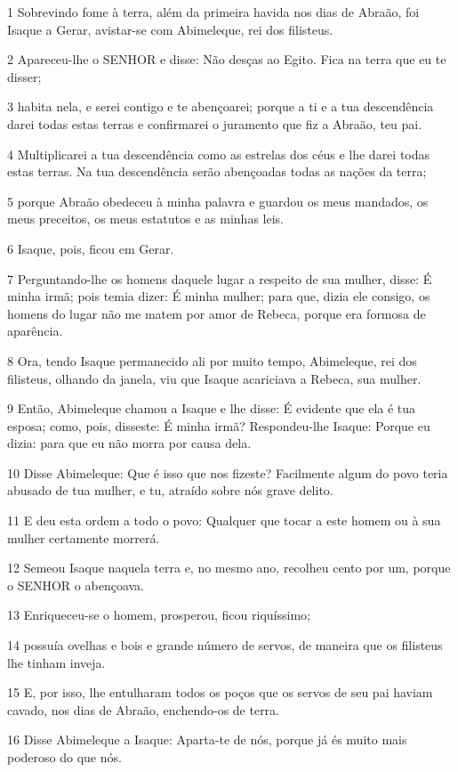 \par 1 Sobrevindo fome à terra, além da primeira havida nos dias de Abraão, foi Isaque a Gerar, avistar-se com Abimeleque, rei dos filisteus.
\par 2 Apareceu-lhe o SENHOR e disse: Não desças ao Egito. Fica na terra que eu te disser;
\par 3 habita nela, e serei contigo e te abençoarei; porque a ti e a tua descendência darei todas estas terras e confirmarei o juramento que fiz a Abraão, teu pai.
\par 4 Multiplicarei a tua descendência como as estrelas dos céus e lhe darei todas estas terras. Na tua descendência serão abençoadas todas as nações da terra;
\par 5 porque Abraão obedeceu à minha palavra e guardou os meus mandados, os meus preceitos, os meus estatutos e as minhas leis.
\par 6 Isaque, pois, ficou em Gerar.
\par 7 Perguntando-lhe os homens daquele lugar a respeito de sua mulher, disse: É minha irmã; pois temia dizer: É minha mulher; para que, dizia ele consigo, os homens do lugar não me matem por amor de Rebeca, porque era formosa de aparência.
\par 8 Ora, tendo Isaque permanecido ali por muito tempo, Abimeleque, rei dos filisteus, olhando da janela, viu que Isaque acariciava a Rebeca, sua mulher.
\par 9 Então, Abimeleque chamou a Isaque e lhe disse: É evidente que ela é tua esposa; como, pois, disseste: É minha irmã? Respondeu-lhe Isaque: Porque eu dizia: para que eu não morra por causa dela.
\par 10 Disse Abimeleque: Que é isso que nos fizeste? Facilmente algum do povo teria abusado de tua mulher, e tu, atraído sobre nós grave delito.
\par 11 E deu esta ordem a todo o povo: Qualquer que tocar a este homem ou à sua mulher certamente morrerá.
\par 12 Semeou Isaque naquela terra e, no mesmo ano, recolheu cento por um, porque o SENHOR o abençoava.
\par 13 Enriqueceu-se o homem, prosperou, ficou riquíssimo;
\par 14 possuía ovelhas e bois e grande número de servos, de maneira que os filisteus lhe tinham inveja.
\par 15 E, por isso, lhe entulharam todos os poços que os servos de seu pai haviam cavado, nos dias de Abraão, enchendo-os de terra.
\par 16 Disse Abimeleque a Isaque: Aparta-te de nós, porque já és muito mais poderoso do que nós.
